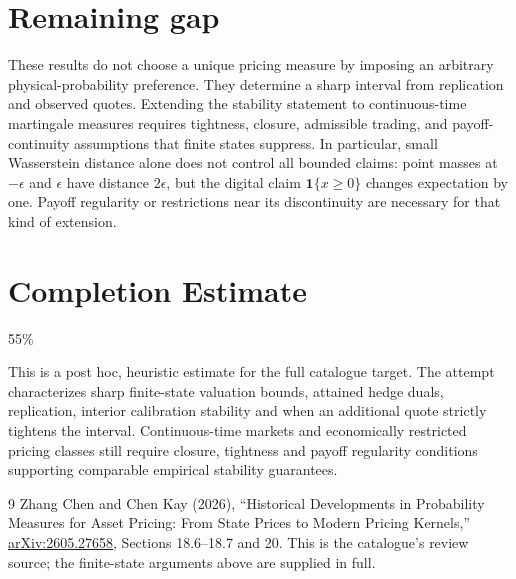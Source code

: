\documentclass[11pt,a4paper]{article}
\theoremstyle{remark}
\newcommand{\ind}{\mathbf 1}
\begin{document}
\section{Remaining gap}
These results do not choose a unique pricing measure by imposing an arbitrary physical-probability preference. They determine a sharp interval from replication and observed quotes. Extending the stability statement to continuous-time martingale measures requires tightness, closure, admissible trading, and payoff-continuity assumptions that finite states suppress. In particular, small Wasserstein distance alone does not control all bounded claims: point masses at $-\epsilon$ and $\epsilon$ have distance $2\epsilon$, but the digital claim $\ind\{x\ge0\}$ changes expectation by one. Payoff regularity or restrictions near its discontinuity are necessary for that kind of extension.

\section{Completion Estimate}
55\%

This is a post hoc, heuristic estimate for the full catalogue target.
The attempt characterizes sharp finite-state valuation bounds, attained hedge duals, replication, interior calibration stability and when an additional quote strictly tightens the interval. Continuous-time markets and economically restricted pricing classes still require closure, tightness and payoff regularity conditions supporting comparable empirical stability guarantees.

\begin{thebibliography}{9}
 Zhang Chen and Chen Kay (2026), ``Historical Developments in Probability Measures for Asset Pricing: From State Prices to Modern Pricing Kernels,'' \href{https://arxiv.org/abs/2605.27658}{arXiv:2605.27658}, Sections 18.6--18.7 and 20. This is the catalogue's review source; the finite-state arguments above are supplied in full.
\end{thebibliography}
\end{document}
